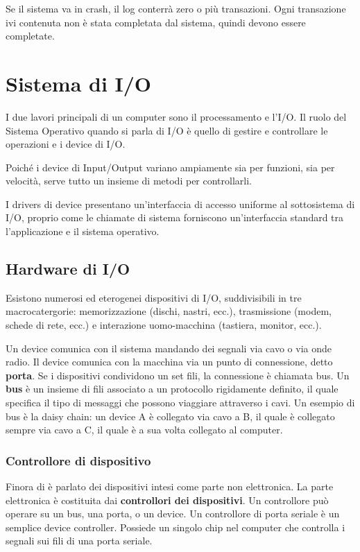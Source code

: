 \documentclass[a4paper]{article}
\begin{document}
Se il sistema va in crash, il log conterrà zero o più transazioni. Ogni transazione ivi contenuta non è stata completata dal sistema, quindi devono essere completate.

\newpage
\section{Sistema di I/O}

I due lavori principali di un computer sono il processamento e l'I/O. Il ruolo del Sistema Operativo quando si parla di I/O è quello di gestire e controllare le operazioni e i device di I/O.

Poiché i device di Input/Output variano ampiamente sia per funzioni, sia per velocità, serve tutto un insieme di metodi per controllarli.

I drivers di device presentano un'interfaccia di accesso uniforme al sottosistema di I/O, proprio come le chiamate di sistema forniscono un'interfaccia standard tra l'applicazione e il sistema operativo.

\subsection{Hardware di I/O}
Esistono numerosi ed eterogenei dispositivi di I/O, suddivisibili in tre macrocatergorie: memorizzazione (dischi, nastri, ecc.), trasmissione (modem, schede di rete, ecc.) e interazione uomo-macchina (tastiera, monitor, ecc.).

Un device comunica con il sistema mandando dei segnali via cavo o via onde radio. Il device comunica con la macchina via un punto di connessione, detto \textbf{porta}. Se i dispositivi condividono un set fili, la connessione è chiamata bus. Un \textbf{bus} è un insieme di fili associato a un protocollo rigidamente definito, il quale specifica il tipo di messaggi che possono viaggiare attraverso i cavi. Un esempio di bus è la daisy chain: un device A è collegato via cavo a B, il quale è collegato sempre via cavo a C, il quale è a sua volta collegato al computer.

\subsubsection{Controllore di dispositivo}

Finora di è parlato dei dispositivi intesi come parte non elettronica. La parte elettronica è costituita dai \textbf{controllori dei dispositivi}. Un controllore può operare su un bus, una porta, o un device. Un controllore di porta seriale è un semplice device controller. Possiede un singolo chip nel computer che controlla i segnali sui fili di una porta seriale.
\end{document}
